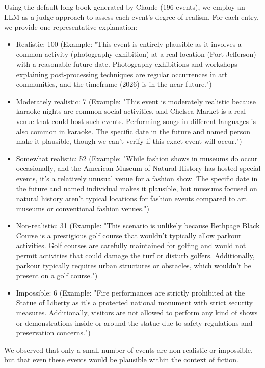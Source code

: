\documentclass{article}
\begin{document}
Using the default long book generated by Claude (196 events), we employ an LLM-as-a-judge approach to assess each event's degree of realism. For each entry, we provide one representative explanation:
\begin{itemize}
    \item Realistic: 100 (Example: "This event is entirely plausible as it involves a common activity (photography exhibition) at a real location (Port Jefferson) with a reasonable future date. Photography exhibitions and workshops explaining post-processing techniques are regular occurrences in art communities, and the timeframe (2026) is in the near future.")
    \item Moderately realistic: 7 (Example: "This event is moderately realistic because karaoke nights are common social activities, and Chelsea Market is a real venue that could host such events. Performing songs in different languages is also common in karaoke. The specific date in the future and named person make it plausible, though we can't verify if this exact event will occur.")
    \item Somewhat realistic: 52 (Example: "While fashion shows in museums do occur occasionally, and the American Museum of Natural History has hosted special events, it's a relatively unusual venue for a fashion show. The specific date in the future and named individual makes it plausible, but museums focused on natural history aren't typical locations for fashion events compared to art museums or conventional fashion venues.")
    \item Non-realistic: 31 (Example: "This scenario is unlikely because Bethpage Black Course is a prestigious golf course that wouldn't typically allow parkour activities. Golf courses are carefully maintained for golfing and would not permit activities that could damage the turf or disturb golfers. Additionally, parkour typically requires urban structures or obstacles, which wouldn't be present on a golf course.")
    \item Impossible: 6 (Example: "Fire performances are strictly prohibited at the Statue of Liberty as it's a protected national monument with strict security measures. Additionally, visitors are not allowed to perform any kind of shows or demonstrations inside or around the statue due to safety regulations and preservation concerns.")
\end{itemize}

We observed that only a small number of events are non-realistic or impossible, but that even these events would be plausible within the context of fiction.
\end{document}
